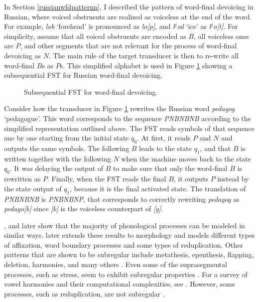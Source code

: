 In Section \ref{russianwfdpatternn}, I described the pattern of word-final devoicing in Russian, where voiced obstruents are realized as voiceless at the end of the word.
For example, \emph{lob} `forehead' is pronounced as \emph{lo[p]}, and \emph{l$^j$od} `ice' as \emph{l$^j$o[t]}.
For simplicity, assume that all voiced obstruents are encoded as $B$, all voiceless ones are $P$, and other segments that are not relevant for the process of word-final devoicing as $N$.
The main rule of the target transducer is then to re-write all word-final $B$s as $P$s.
This simplified alphabet is used in Figure \ref{ssqwfdddd} showing a subsequential FST for Russian word-final devoicing.


\begin{figure}[h!] 
\centering
{}
\caption{Subsequential FST for word-final devoicing.}
\label{ssqwfdddd}
\end{figure}

Consider how the transducer in Figure \ref{ssqwfdddd} rewrites the Russian word \emph{pedagog} `pedagogue'.
This word corresponds to the sequence  \emph{PNBNBNB} according to the simplified representation outlined above.
The FST reads symbols of that sequence one by one starting from the initial state $q_0$.
At first, it reads $P$ and $N$ and outputs the same symbols.
The following $B$ leads to the state $q_{1}$, and that $B$ is written together with the following $N$ when the machine moves back to the state $q_0$.
It was delaying the output of $B$ to make sure that only the word-final $B$ is rewritten as $P$.
Finally, when the FST reads the final $B$, it outputs $P$ instead by the state output of $q_{1}$, because it is the final activated state.
The translation of \emph{PNBNBNB} is \emph{PNBNBNP}, that corresponds to correctly rewriting \emph{pedagog} as \emph{pedago[k]} since \emph{[k]} is the voiceless counterpart of \emph{[g]}.


\cite{Chandlee2014}, and later \cite{ChandleeHeinz2018} show that the majority of phonological processes can be modeled in similar ways.
\cite{Chandlee2017} later extends these results to morphology and models different types of affixation, word boundary processes and some types of reduplication.
Other patterns that are shown to be subregular include metathesis, epenthesis, flapping, deletion, harmonies, and many others \citep{Chandlee2014}.
Even some of the suprasegmental processes, such as stress, seem to exhibit subregular properties \citep{RogersPres}.
For a survey of vowel harmonies and their computational complexities, see \citep{GainorLai12}.
However, some processes, such as reduplication, are not subregular \citep{DolatianHeinz2018}.


